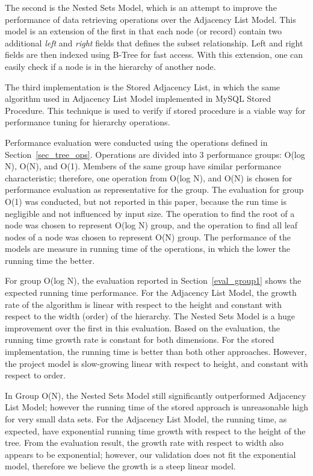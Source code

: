 The second is the Nested Sets Model, which is an attempt to improve the performance of data retrieving operations over the Adjacency List Model. This model is an extension of the first in that each node (or record) contain two additional {\em left} and {\em right} fields that defines the subset relationship. Left and right fields are then indexed using B-Tree for fast access. With this extension, one can easily check if a node is in the hierarchy of another node.

The third implementation is the Stored Adjacency List, in which the same algorithm used in Adjacency List Model implemented in MySQL Stored Procedure. This technique is used to verify if stored procedure is a viable way for performance tuning for hierarchy operations.

Performance evaluation were conducted using the operations defined in Section~\ref{sec_tree_ops}. Operations are divided into 3 performance groups: O(log N), O(N), and O(1). Members of the same group have similar performance characteristic; therefore, one operation from O(log N), and O(N) is chosen for performance evaluation as representative for the group. The evaluation for group O(1) was conducted, but not reported in this paper, because the run time is negligible and not influenced by input size. The operation to find the root of a node was chosen to represent O(log N) group, and the operation to find all leaf nodes of a node was chosen to represent O(N) group. The performance of the models are measure in running time of the operations, in which the lower the running time the better.

For group O(log N), the evaluation reported in Section~\ref{eval_group1} shows the expected running time performance. For the Adjacency List Model, the growth rate of the algorithm is linear with respect to the height and constant with respect to the width (order) of the hierarchy. The Nested Sets Model is a huge improvement over the first in this evaluation. Based on the evaluation, the running time growth rate is constant for both dimensions. For the stored implementation, the running time is better than both other approaches. However, the project model is slow-growing linear with respect to height, and constant with respect to order.

In Group O(N), the Nested Sets Model still significantly outperformed Adjacency List Model; however the running time of the stored approach is unreasonable high for very small data sets. For the Adjacency List Model, the running time, as expected, have exponential running time growth with respect to the height of the tree. From the evaluation result, the growth rate with respect to width also appears to be exponential; however, our validation does not fit the exponential model, therefore we believe the growth is a steep linear model.

